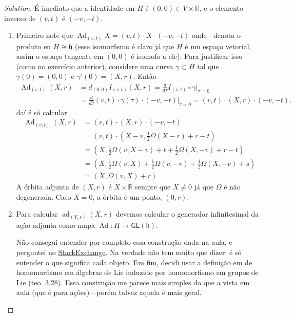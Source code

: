 \begin{proof}[Solution]\leavevmode
É imediato que a identidade em $H$ é $(0,0)\in V\times \mathbb{R}$, e o elemento inverso de $(v,t)$  é $(-v,-t)$.
 \begin{enumerate}[label=\alph*.]
	\item Primeiro note que $\operatorname{Ad}_{(v,t)}X=(v,t)\cdot X\cdot(-v,-t)$ onde $\cdot$ denota o produto en $H\cong \mathfrak{h}$ (esse isomorfismo é claro já que $H$ é um espaço vetorial, assim o espaço tangente em $(0,0)$  é isomofo a ele). Para justificar isso (como no exercício anterior), considere uma curva $\gamma\subset H$ tal que $\gamma(0)=(0,0)$ e $\gamma'(0)=(X,r)$. Então 
		\begin{align*}
			\operatorname{Ad}_{(v,t)}(X,r)&=d_{(0,0)}I_{(v,t)}(X,r)=\frac{d}{d\tau}I_{(v,t)}\circ \gamma\Big|_{\tau=0}\\&=\frac{d}{d\tau}(v,t)\cdot \gamma(\tau)\cdot(-v,-t)\Big|_{\tau=0}=(v,t)\cdot (X,r)\cdot(-v,-t).
		\end{align*}
daí é só calcular
		\begin{align*}
			\operatorname{Ad}_{(v,t)}(X,r)&=(v,t)\cdot(X,r)\cdot(-v,-t)\\
			&=(v,t)\cdot\left(X-v, \frac{1}{2}\Omega(X-r)+r-t \right) \\
			&=\left( X,\frac{1}{2}\Omega(v,X-v)+t+\frac{1}{2}\Omega(X,-v)+r-t \right) \\
			&=\left( X,\frac{1}{2}\Omega(v,X)+\frac{1}{2}\Omega(v,-v)+\frac{1}{2}\Omega(X,-v)+s \right) \\
			&=(X,\Omega(v,X)+r)
		\end{align*}
A órbita adjunta de $(X,r)$  é $X\times \mathbb{R}$ sempre que $X\neq 0$ já que $\Omega$ é não degenerada. Caso $X=0$, a  órbita é um ponto, $(0,r)$.

\item Para calcular $\operatorname{ad}_{(Y,s)}(X,r)$ devemos calcular o generador infinitesimal da ação adjunta como mapa $\operatorname{Ad}:H\to \mathsf{GL}(\mathfrak{h})$. 

\begin{remark}\leavevmode
	Não consegui entender por completo essa construção dada na aula, e perguntei no \href{https://math.stackexchange.com/questions/4984625/compute-the-derivative-of-adjoint-action-on-heisenberg-group?noredirect=1#comment10681405_4984625}{StackExchange}. Na verdade não tem muito que dizer: é só entender o que significa cada objeto. Em fim, decidi usar a definição em \cite{hall} de homomorfismo em álgebras de Lie induzido por homomorfismo em grupos de Lie (teo. 3.28). Essa construção me parece mais simples do que a vista em aula (que é para ações)---porém talvez aquela é mais geral.
\end{remark}


\end{enumerate}
\end{proof}
